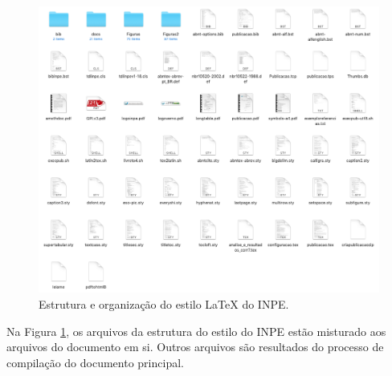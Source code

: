 \begin{figure}[H]
    \centering
    \includegraphics[scale=0.4]{./figs/estrutura_estilo_inpe.png}
    \caption{Estrutura e organização do estilo \LaTeX{} do INPE.}
    \label{fig:estrut}
\end{figure}

Na Figura \ref{fig:estrut}, os arquivos da estrutura do estilo do INPE estão misturado aos arquivos do documento em si. Outros arquivos são resultados do processo de compilação do documento principal.

